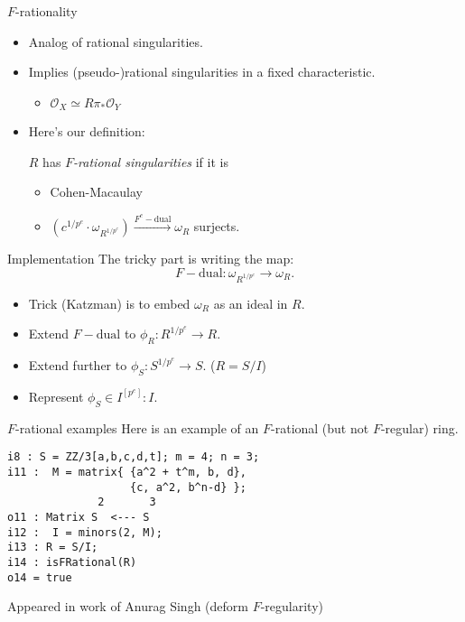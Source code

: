 \documentclass[xcolor=dvipsnames]{beamer}
\newcommand{\memph}[1]{{\color{Red}\emph{#1}}}
\renewcommand{\O}{\mbox{$\mathcal{O}$}}
\theoremstyle{remark}
\begin{document}
\begin{frame}[c]{$F$-rationality}
    \begin{itemize}
        \item<1->  Analog of rational singularities.
        \item<2->  Implies (pseudo-)rational singularities in a fixed characteristic.
        \begin{itemize}
            \item<3->  $\mathcal{O}_X \simeq R \pi_* \O_Y$
        \end{itemize}
        \item<4->  Here's our definition:
        \begin{definition}
            $R$ has \memph{$F$-rational singularities} if it is
            \begin{itemize}
                \item<5->  Cohen-Macaulay
                \item<6->  $(c^{1/p^e} \cdot \omega_{R^{1/p^e}}) \xrightarrow{F^e-\mathrm{dual}} \omega_R$ surjects.
            \end{itemize}
        \end{definition}
    \end{itemize}
\end{frame}

\begin{frame}[c]{Implementation}
    The tricky part is writing the map:
    \[
    F-\mathrm{dual}: \omega_{R^{1/p^e}} \to \omega_R.
    \]
    \begin{itemize}
        \item<2->  Trick (Katzman) is to embed $\omega_R$ as an ideal in $R$.
        \item<3->  Extend $F-\mathrm{dual}$ to $\phi_R : R^{1/p^e} \to R$.
        \item<4->  Extend further to $\phi_S : S^{1/p^e} \to S$.  ($R = S/I$)
        \item<5->  Represent $\phi_S \in I^{[p^e]} : I$.
    \end{itemize}
\end{frame}

\begin{frame}[fragile]{$F$-rational examples}
    Here is an example of an $F$-rational (but not $F$-regular) ring.
    \begin{verbatim}
i8 : S = ZZ/3[a,b,c,d,t]; m = 4; n = 3;
i11 :  M = matrix{ {a^2 + t^m, b, d},
                   {c, a^2, b^n-d} };
              2       3
o11 : Matrix S  <--- S
i12 :  I = minors(2, M);
i13 : R = S/I;
i14 : isFRational(R)
o14 = true
\end{verbatim}
Appeared in work of Anurag Singh (deform $F$-regularity)
\end{frame}
\end{document}
